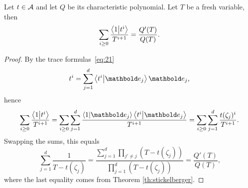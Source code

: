 \begin{lemma}
  \label{th:multi-newton-sums}
  Let $t\in\mathcal{A}$ and let $Q$ be its characteristic
  polynomial. Let $T$ be a fresh variable, then
  \begin{equation}
    \label{eq:25}
    \sum_{i\ge0} \frac{\left\langle 1 \middle| t^{i} \right\rangle}{T^{i+1}} = \frac{Q'(T)}{Q(T)}
    \text{.}
  \end{equation}
\end{lemma}
\begin{proof}
  By the trace formulas~\eqref{eq:21}
  \begin{equation}
    \label{eq:26}
    t^i = \sum_{j=1}^d\braket{t^i}{\basis{e}_j}\basis{e}_j
    \text{,}
  \end{equation}
  hence
  \begin{equation}
    \label{eq:27}
    \sum_{i\ge0}\frac{\braket{1}{t^i}}{T^{i+1}} =
    \sum_{i\ge0}\sum_{j=1}^d\frac{\braket{1}{\basis{e}_j}\braket{t^i}{\basis{e}_j}}{T^{i+1}} =
    \sum_{i\ge0}\sum_{j=1}^d\frac{t(\zeta_j)^i}{T^{i+1}}
    \text{.}
  \end{equation}
  Swapping the sums, this equals
  \begin{equation}
    \label{eq:28}
    \sum_{j=1}^d\frac{1}{T-t(\zeta_j)} =
    \frac{\sum_{j=1}^d\prod_{j'\ne j}(T-t(\zeta_j))}{\prod_{j=1}^d(T-t(\zeta_j))} =
    \frac{Q'(T)}{Q(T)}
    \text{,}
  \end{equation}
  where the last equality comes from Theorem \ref{th:stickelberger}.
\end{proof}

